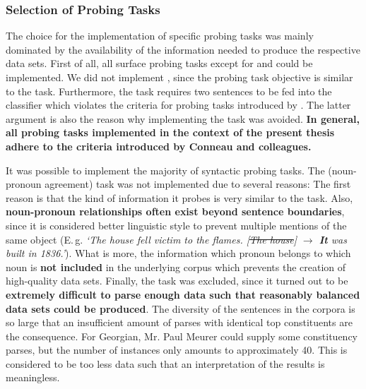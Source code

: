 \subsubsection{Selection of Probing Tasks}
\label{sec:probing_tasks_selection}

The choice for the implementation of specific probing tasks was mainly dominated by the availability of the information needed to produce the respective data sets. First of all, all surface probing tasks except for  and  could be implemented. We did not implement , since the probing task objective is similar to the  task. Furthermore, the task requires two sentences to be fed into the classifier which violates the criteria for probing tasks introduced by \citep{Conneau.2018a}. The latter argument is also the reason why implementing the  task was avoided. \textbf{In general, all probing tasks implemented in the context of the present thesis adhere to the criteria introduced by Conneau and colleagues.}

It was possible to implement the majority of syntactic probing tasks. The  (noun-pronoun agreement) task was not implemented due to several reasons: The first reason is that the kind of information it probes is very similar to the  task. Also, \textbf{noun-pronoun relationships often exist beyond sentence boundaries}, since it is considered better linguistic style to prevent multiple mentions of the same object (E.\,g. \textit{`The house fell victim to the flames. [\st{The house}] $\rightarrow$ \textbf{It} was built in 1836.'}). What is more, the information which pronoun belongs to which noun is \textbf{not included} in the underlying corpus which prevents the creation of high-quality data sets. Finally, the  task was excluded, since it turned out to be \textbf{extremely difficult to parse enough data such that reasonably balanced data sets could be produced}. The diversity of the sentences in the corpora is so large that an insufficient amount of parses with identical top constituents are the consequence. For Georgian, Mr. Paul Meurer could supply some constituency parses, but the number of instances only amounts to approximately 40. This is considered to be too less data such that an interpretation of the results is meaningless.


